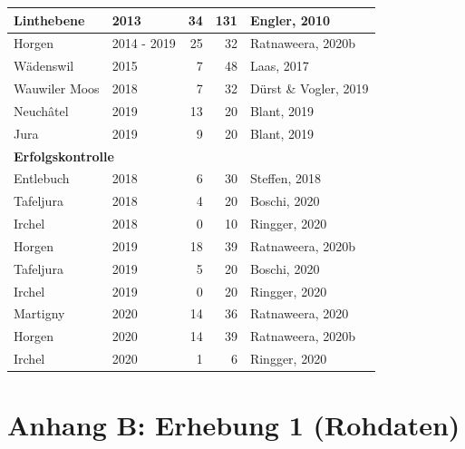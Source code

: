 \documentclass[
  oneside]{scrbook}
\begin{document}
\begin{table}[H]
\begin{tabular}[t]{l|l|r|r|l}
\hline
\hspace{1em}Linthebene & 2013 & 34 & 131 & Engler, 2010\\
\hline
\hspace{1em}Horgen & 2014 - 2019 & 25 & 32 & Ratnaweera, 2020b\\
\hline
\hspace{1em}Wädenswil & 2015 & 7 & 48 & Laas, 2017\\
\hline
\hspace{1em}Wauwiler Moos & 2018 & 7 & 32 & Dürst \& Vogler, 2019\\
\hline
\hspace{1em}Neuchâtel & 2019 & 13 & 20 & Blant, 2019\\
\hline
\hspace{1em}Jura & 2019 & 9 & 20 & Blant, 2019\\
\hline
\multicolumn{5}{l}{\textbf{Erfolgskontrolle}}\\
\hline
\hspace{1em}Entlebuch & 2018 & 6 & 30 & Steffen, 2018\\
\hline
\hspace{1em}Tafeljura & 2018 & 4 & 20 & Boschi, 2020\\
\hline
\hspace{1em}Irchel & 2018 & 0 & 10 & Ringger, 2020\\
\hline
\hspace{1em}Horgen & 2019 & 18 & 39 & Ratnaweera, 2020b\\
\hline
\hspace{1em}Tafeljura & 2019 & 5 & 20 & Boschi, 2020\\
\hline
\hspace{1em}Irchel & 2019 & 0 & 20 & Ringger, 2020\\
\hline
\hspace{1em}Martigny & 2020 & 14 & 36 & Ratnaweera, 2020\\
\hline
\hspace{1em}Horgen & 2020 & 14 & 39 & Ratnaweera, 2020b\\
\hline
\hspace{1em}Irchel & 2020 & 1 & 6 & Ringger, 2020\\
\hline
\end{tabular}
\end{table}

\hypertarget{anhang-b-erhebung-1-rohdaten}{%
\section{Anhang B: Erhebung 1 (Rohdaten)}\label{anhang-b-erhebung-1-rohdaten}}
\end{document}
